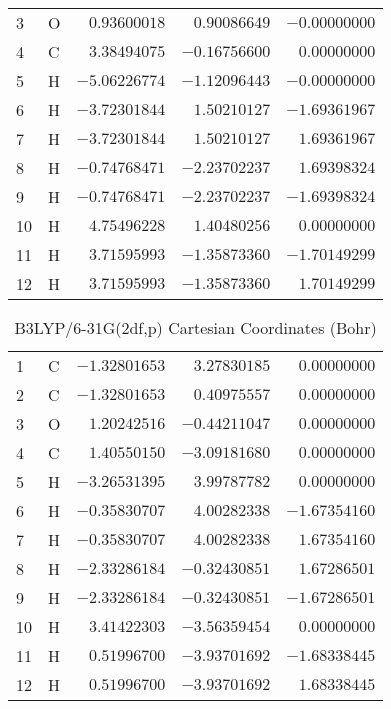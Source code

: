 \documentclass[10pt,oneside]{article}
\begin{document}
\begin{table}[h!]
\begin{multicols}{2}
\begin{tabular}{llrrr}
3  & O  & $ 0.93600018$ & $ 0.90086649$ & $-0.00000000$ \\
4  & C  & $ 3.38494075$ & $-0.16756600$ & $ 0.00000000$ \\
5  & H  & $-5.06226774$ & $-1.12096443$ & $-0.00000000$ \\
6  & H  & $-3.72301844$ & $ 1.50210127$ & $-1.69361967$ \\
7  & H  & $-3.72301844$ & $ 1.50210127$ & $ 1.69361967$ \\
8  & H  & $-0.74768471$ & $-2.23702237$ & $ 1.69398324$ \\
9  & H  & $-0.74768471$ & $-2.23702237$ & $-1.69398324$ \\
10 & H  & $ 4.75496228$ & $ 1.40480256$ & $ 0.00000000$ \\
11 & H  & $ 3.71595993$ & $-1.35873360$ & $-1.70149299$ \\
12 & H  & $ 3.71595993$ & $-1.35873360$ & $ 1.70149299$ \\
\bottomrule
\end{tabular}
\end{multicols}
\end{table}

\begin{table}[h]
\centering
\caption{B3LYP/6-31G(2df,p) Cartesian Coordinates (Bohr)}
\begin{tabular}{llrrr}
\toprule
1  & C  & $-1.32801653$ & $ 3.27830185$ & $ 0.00000000$ \\
2  & C  & $-1.32801653$ & $ 0.40975557$ & $ 0.00000000$ \\
3  & O  & $ 1.20242516$ & $-0.44211047$ & $ 0.00000000$ \\
4  & C  & $ 1.40550150$ & $-3.09181680$ & $ 0.00000000$ \\
5  & H  & $-3.26531395$ & $ 3.99787782$ & $ 0.00000000$ \\
6  & H  & $-0.35830707$ & $ 4.00282338$ & $-1.67354160$ \\
7  & H  & $-0.35830707$ & $ 4.00282338$ & $ 1.67354160$ \\
8  & H  & $-2.33286184$ & $-0.32430851$ & $ 1.67286501$ \\
9  & H  & $-2.33286184$ & $-0.32430851$ & $-1.67286501$ \\
10 & H  & $ 3.41422303$ & $-3.56359454$ & $ 0.00000000$ \\
11 & H  & $ 0.51996700$ & $-3.93701692$ & $-1.68338445$ \\
12 & H  & $ 0.51996700$ & $-3.93701692$ & $ 1.68338445$ \\
\bottomrule
\end{tabular}
\end{table}
\end{document}
